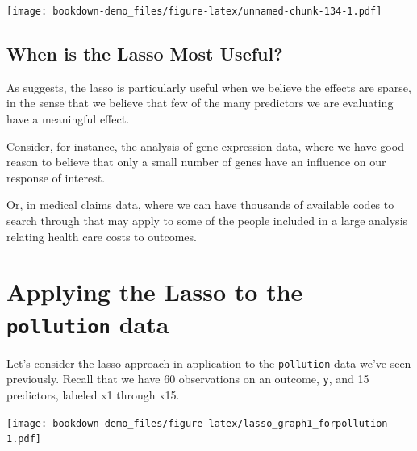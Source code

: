 \documentclass[]{book}
\newenvironment{Shaded}{\begin{snugshade}}{\end{snugshade}}
\newcommand{\KeywordTok}[1]{\textcolor[rgb]{0.13,0.29,0.53}{\textbf{#1}}}
\newcommand{\DataTypeTok}[1]{\textcolor[rgb]{0.13,0.29,0.53}{#1}}
\newcommand{\StringTok}[1]{\textcolor[rgb]{0.31,0.60,0.02}{#1}}
\newcommand{\OperatorTok}[1]{\textcolor[rgb]{0.81,0.36,0.00}{\textbf{#1}}}
\newcommand{\NormalTok}[1]{#1}
\theoremstyle{definition}
\theoremstyle{definition}
\theoremstyle{definition}
\theoremstyle{remark}
\begin{document}
\texttt{[image: bookdown-demo\_files/figure-latex/unnamed-chunk-134-1.pdf]}

\subsection{When is the Lasso Most
Useful?}\label{when-is-the-lasso-most-useful}

As \citet{Faraway2015} suggests, the lasso is particularly useful when
we believe the effects are sparse, in the sense that we believe that few
of the many predictors we are evaluating have a meaningful effect.

Consider, for instance, the analysis of gene expression data, where we
have good reason to believe that only a small number of genes have an
influence on our response of interest.

Or, in medical claims data, where we can have thousands of available
codes to search through that may apply to some of the people included in
a large analysis relating health care costs to outcomes.

\section{\texorpdfstring{Applying the Lasso to the \texttt{pollution}
data}{Applying the Lasso to the pollution data}}\label{applying-the-lasso-to-the-pollution-data}

Let's consider the lasso approach in application to the
\texttt{pollution} data we've seen previously. Recall that we have 60
observations on an outcome, \texttt{y}, and 15 predictors, labeled x1
through x15.

\begin{Shaded}
\end{Shaded}

\texttt{[image: bookdown-demo\_files/figure-latex/lasso\_graph1\_forpollution-1.pdf]}
\end{document}
